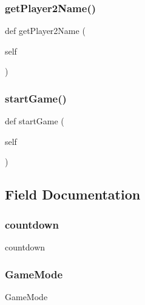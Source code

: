\subsubsection{\texorpdfstring{get\+Player2\+Name()}{getPlayer2Name()}}
{\footnotesize\ttfamily def get\+Player2\+Name (\begin{DoxyParamCaption}\item[{}]{self }\end{DoxyParamCaption})}

\hypertarget{classgame_1_1game_1_1_game_aa78d70ae2aafa130eaa143ce55887aff}{}\label{classgame_1_1game_1_1_game_aa78d70ae2aafa130eaa143ce55887aff} 
\subsubsection{\texorpdfstring{start\+Game()}{startGame()}}
{\footnotesize\ttfamily def start\+Game (\begin{DoxyParamCaption}\item[{}]{self }\end{DoxyParamCaption})}



\subsection{Field Documentation}
\hypertarget{classgame_1_1game_1_1_game_acb971b832c5f8a89e9995caaee26a1df}{}\label{classgame_1_1game_1_1_game_acb971b832c5f8a89e9995caaee26a1df} 
\subsubsection{\texorpdfstring{countdown}{countdown}}
{\footnotesize\ttfamily countdown}

\hypertarget{classgame_1_1game_1_1_game_aaf5ef5a17b53e9997c837b07015589de}{}\label{classgame_1_1game_1_1_game_aaf5ef5a17b53e9997c837b07015589de} 
\subsubsection{\texorpdfstring{Game\+Mode}{GameMode}}
{\footnotesize\ttfamily Game\+Mode}


